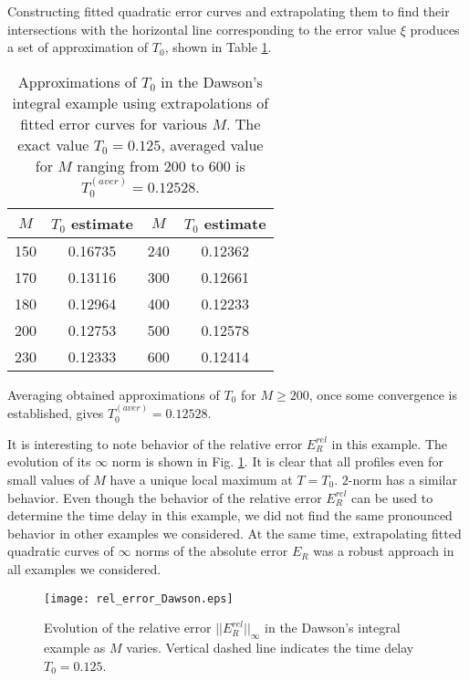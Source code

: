\documentclass[journal,twoside]{IEEEtran}
\begin{document}
Constructing fitted quadratic error curves and extrapolating them to find their intersections with the horizontal line corresponding to  the error value $\xi$ produces a set of approximation of $T_0$, shown in Table \ref{T0approx_Dawson_table}.
\begin{table}[h]
\begin{center}
\begin{tabular}{|c|c||c|c|}
\hline
\rule{0cm}{10pt}
$M$ & $T_0$ estimate & $M$ & $T_0$ estimate \\[3pt]
\hline
\rule{0cm}{10pt}
  150 &     0.16735 & 240  & 0.12362 \\[3pt]
\hline
\rule{0cm}{10pt}  
  170 &  0.13116  &   300  &  0.12661 \\[3pt]
\hline
\rule{0cm}{10pt}  
180  &  0.12964 & 400  & 0.12233 \\[3pt] 
\hline
\rule{0cm}{10pt}    
200  &  0.12753 & 500  &  0.12578 \\
\hline
\rule{0cm}{10pt}    
230  &  0.12333 & 600  &  0.12414 \\
\hline
\end{tabular}
\end{center}
\caption{Approximations of $T_0$ in the Dawson's integral example using extrapolations of fitted error curves for various $M$. The exact value $T_0=0.125$, averaged value for $M$ ranging from 200 to 600 is $T_0^{(aver)}=0.12528$.}
\label{T0approx_Dawson_table}
\end{table} 
Averaging obtained approximations of $T_0$ for $M\geq 200$, once some convergence is established, gives $T_0^{(aver)}=0.12528$.

It is interesting to note behavior of the relative error $E_R^{rel}$ in this example. The evolution of its $\infty$ norm is shown in Fig. \ref{FDawson3}. It is clear that all profiles even for small values of $M$ have a unique local maximum at $T=T_0$. $2$-norm has a similar behavior. Even though the behavior of the relative error $E_R^{rel}$  can be used to determine the time delay in this example, we did not find the same pronounced behavior in other examples we considered. At the same time, extrapolating fitted quadratic curves of $\infty$ norms of the absolute error $E_R$ was a robust approach in all examples we considered.
\begin{figure} \begin{center}
\texttt{[image: rel\_error\_Dawson.eps]}
\end{center}
\caption{Evolution of the relative error $||E_R^{rel}||_\infty$ in the Dawson's integral example as $M$ varies. Vertical dashed line indicates the time delay $T_0=0.125$.}
\label{FDawson3}
\end{figure}
\end{document}
